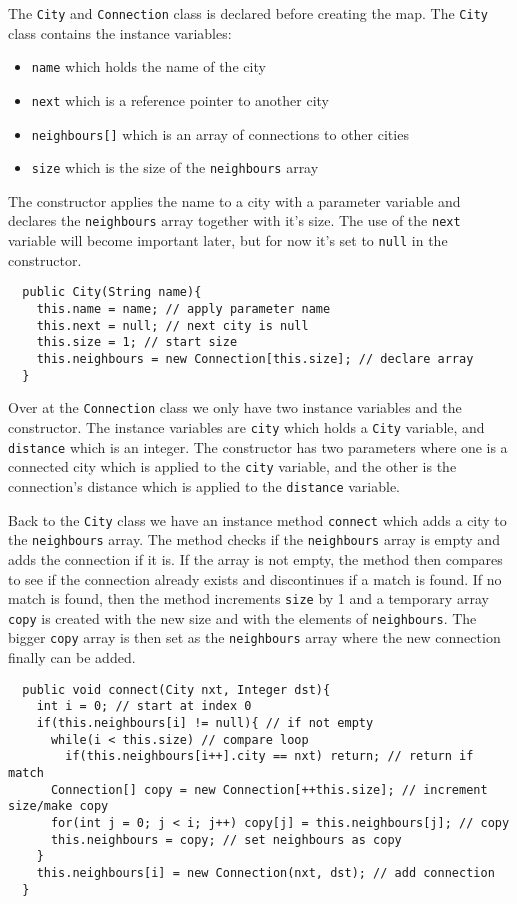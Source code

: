 \documentclass[a4paper,11pt]{article}
\begin{document}
The {\tt City} and {\tt Connection} class is declared before creating the
map. The {\tt City} class contains the instance variables:
\begin{itemize}
  \item {\tt name} which holds the name of the city
  \item {\tt next} which is a reference pointer to another city
  \item {\tt neighbours[]} which is an array of connections to other cities
  \item {\tt size} which is the size of the {\tt neighbours} array
\end{itemize}
The constructor applies the name to a city with a parameter variable and
declares the {\tt neighbours} array together with it's size. The use of 
the {\tt next} variable will become important later, but for now it's set 
to {\tt null} in the constructor.

\begin{verbatim}
  public City(String name){
    this.name = name; // apply parameter name
    this.next = null; // next city is null
    this.size = 1; // start size 
    this.neighbours = new Connection[this.size]; // declare array
  }
\end{verbatim}

Over at the {\tt Connection} class we only have two instance variables 
and the constructor. The instance variables are {\tt city} which holds a
{\tt City} variable, and {\tt distance} which is an integer. The 
constructor has two parameters where one is a connected city which
is applied to the {\tt city} variable, and the other is the connection's 
distance which is applied to the {\tt distance} variable.

Back to the {\tt City} class we have an instance method {\tt connect}
which adds a city to the {\tt neighbours} array. The method checks if
the {\tt neighbours} array is empty and adds the connection if it is.
If the array is not empty, the method then compares to see if the 
connection already exists and discontinues if a match is found. If no 
match is found, then the method increments {\tt size} by 1 and a 
temporary array {\tt copy} is created with the new size and with the 
elements of {\tt neighbours}. The bigger {\tt copy} array is then set 
as the {\tt neighbours} array where the new connection finally can be 
added.

\begin{verbatim}
  public void connect(City nxt, Integer dst){
    int i = 0; // start at index 0
    if(this.neighbours[i] != null){ // if not empty
      while(i < this.size) // compare loop
        if(this.neighbours[i++].city == nxt) return; // return if match
      Connection[] copy = new Connection[++this.size]; // increment size/make copy
      for(int j = 0; j < i; j++) copy[j] = this.neighbours[j]; // copy
      this.neighbours = copy; // set neighbours as copy
    }
    this.neighbours[i] = new Connection(nxt, dst); // add connection
  }
\end{verbatim}
\end{document}

